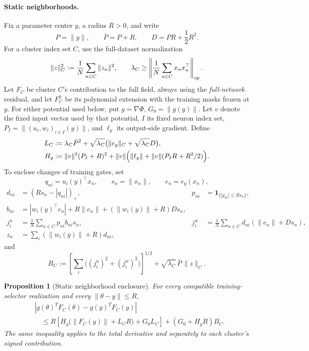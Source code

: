 \documentclass[10pt]{article}
\newtheorem{proposition}[theorem]{Proposition}
\theoremstyle{remark}\newtheorem{remark}[theorem]{Remark}
\begin{document}
\paragraph{Static neighborhoods.}
Fix a parameter center $y$, a radius $R>0$, and write
\[
 P=\|y\|,\qquad \bar P=P+R,\qquad D=PR+\frac12R^2.
\]
For a cluster index set $C$, use the full-dataset normalization
\[
 \|z\|_C^2:=\frac1N\sum_{n\in C}\|z_n\|^2,
 \qquad
 \lambda_C\ge
 \left\|\frac1N\sum_{n\in C}x_nx_n^\top\right\|_{\rm op}.
\]
Let $F_C$ be cluster $C$'s contribution to the full field, always using the
\emph{full-network} residual, and let $F_C^0$ be its polynomial extension
with the training masks frozen at $y$. For either potential used below, put
$g=\nabla\Phi$, $G_0=\|g(y)\|$. Let $v$ denote the fixed input vector used by
that potential, $I$ its fixed neuron index set, $P_I=\|(u_i,w_i)_{i\in I}(y)\|$,
and $\ell_y$ its output-side gradient. Define
\begin{align}
 L_C&:=\lambda_C\bar P^2+
 \sqrt{\lambda_C}\bigl(\|e_y\|_C+\sqrt{\lambda_C}D\bigr),
 \label{eq:canonical-LC}\\
 H_g&:=\|v\|^2(P_I+R)^2+
 \|v\|\Bigl(\|\ell_y\|+\|v\|(P_IR+R^2/2)\Bigr).
 \label{eq:canonical-Hg}
\end{align}
To enclose changes of training gates, set
\[
 q_{ni}=u_i(y)^\top x_n,
 \qquad s_n=\|x_n\|,
 \qquad e_n=e_y(x_n),
\]
\begin{align*}
 d_{ni}&=(Rs_n-|q_{ni}|)_+,
 &p_{ni}&=\mathbf1_{\{|q_{ni}|\le Rs_n\}},\\
 b_{ni}&=|w_i(y)^\top e_n|+R\|e_n\|
       +(\|w_i(y)\|+R)Ds_n,\\
 j_i^u&=\frac1N\sum_{n\in C}p_{ni}b_{ni}s_n,
 &j_i^w&=\frac1N\sum_{n\in C}d_{ni}(\|e_n\|+Ds_n),\\
 z_n&=\sum_i(\|w_i(y)\|+R)d_{ni},
\end{align*}
and
\begin{equation}
 B_C:=\left[\sum_i\bigl((j_i^u)^2+(j_i^w)^2\bigr)\right]^{1/2}
       +\sqrt{\lambda_C}\,\bar P\,\|z\|_C.
 \label{eq:canonical-BC}
\end{equation}

\begin{proposition}[Static neighborhood enclosure]
\label{prop:canonical-static-neighborhood}
For every compatible training-selector realization and every
$\|\theta-y\|\le R$,
\begin{align}
&\left|g(\theta)^TF_C(\theta)-g(y)^TF_C(y)\right|\nonumber\\
&\quad\le
 R\left[H_g\bigl(\|F_C(y)\|+L_CR\bigr)+G_0L_C\right]
 +(G_0+H_gR)B_C.
 \label{eq:canonical-static-neighborhood}
\end{align}
The same inequality applies to the total derivative and separately to each
cluster's signed contribution.
\end{proposition}
\end{document}
